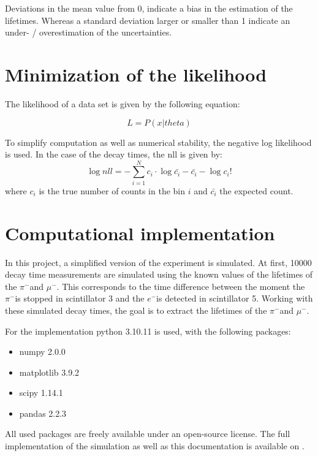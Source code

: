 \documentclass[11pt, a4paper, oneside]{book}
\newcommand{\electron}{$e^{-}$}
\newcommand{\pion}{$\pi^{-}$}
\newcommand{\muon}{$\mu^{-}$}
\begin{document}
Deviations in the mean value from 0, indicate a bias in the estimation of the lifetimes. Whereas a standard deviation larger or smaller than 1 indicate an under- / overestimation of the uncertainties. 

\section{Minimization of the likelihood}
The likelihood of a data set is given by the following equation:

\begin{equation}
    L = P(x | theta)
    \label{eq:likelihood_base}
\end{equation}

To simplify computation as well as numerical stability, the negative log likelihood is used. In the case of the decay times, the nll is given by:
\begin{equation}
  \log{nll} = -\sum_{i=1}^{N} c_i \cdot \log{\bar{c_i}} - \bar{c_i} - \log{c_i!}
  \label{eq:likelihood}
\end{equation}
where $c_i$ is the true number of counts in the bin $i$ and $\bar{c_i}$ the expected count.

\section{Computational implementation}
In this project, a simplified version of the experiment is simulated. At first, \num{10000} decay time measurements are simulated using the known values of the lifetimes of the \pion and \muon. This corresponds to the time difference between the moment the \pion is stopped in scintillator 3 and the \electron is detected in scintillator 5. Working with these simulated decay times, the goal is to extract the lifetimes of the \pion and \muon.

For the implementation python 3.10.11 is used, with the following packages:
\begin{itemize}
    \item numpy 2.0.0
    \item matplotlib 3.9.2
    \item scipy 1.14.1
    \item pandas 2.2.3
\end{itemize}
All used packages are freely available under an open-source license. 
The full implementation of the simulation as well as this documentation is available on \cite{GitHub}.

\end{document}
